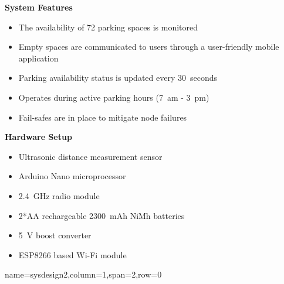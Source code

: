 \documentclass[landscape,a1paper,fontscale=0.47]{baposter} %
\newcommand{\compresslist}{ %
\setlength{\itemsep}{1pt}
\setlength{\parskip}{0pt}
\setlength{\parsep}{0pt}
}
\begin{document}
\begin{poster}
{	\textbf{System Features}
		\begin{itemize}[leftmargin=13pt]\compresslist
			\item The availability of 72 parking spaces is monitored
			\item Empty spaces are communicated to users through a user-friendly mobile application
			\item Parking availability status is updated every 30~seconds
			\item Operates during active parking hours (7~am - 3~pm)
			\item Fail-safes are in place to mitigate node failures
		\end{itemize}
	
	\textbf{Hardware Setup}
		\begin{itemize}[leftmargin=13pt]\compresslist
			\item Ultrasonic distance measurement sensor
			\item Arduino Nano microprocessor
			\item 2.4~GHz radio module
			\item 2*AA rechargeable 2300~mAh NiMh batteries
			\item 5~V boost converter
			\item ESP8266 based Wi-Fi module
		\end{itemize}

}

{name=sysdesign2,column=1,span=2,row=0}{ 
	\begin{multicols}{2}
		

\end{multicols}}
\end{poster}
\end{document}
